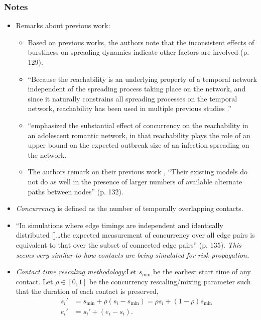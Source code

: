 \subsubsection*{Notes}
\begin{itemize}
\item Remarks about previous work:
    \begin{itemize}
        \item Based on previous works, the authors note that the inconsistent effects of burstiness on spreading dynamics indicate other factors are involved (p. 129).
        \item ``Because the reachability is an underlying property of a temporal network independent of the spreading process taking place on the network, and since it naturally constrains all spreading processes on the temporal network, reachability has been used in multiple previous studies \cite{Armbruster2017, Holme2005, Lentz2013, Moody2002, Moody2016, Onaga2017}.''
        \item \cite{Moody2002} ``emphasized the substantial effect of concurrency on the reachability in an adolescent romantic network, in that reachability plays the role of an upper bound on the expected outbreak size of an infection spreading on the network.
        \item The authors remark on their previous work \cite{Lee2019a}, ``Their existing models do not do as well in the presence of larger numbers of available alternate paths between nodes'' (p. 132).
    \end{itemize}
\item \emph{Concurrency} is defined as the number of temporally overlapping contacts.
\item ``In simulations where edge timings are independent and identically distributed [\cite{Moody2016, Lee2019a}]{\ldots}the expected measurement of concurrency over all edge pairs is equivalent to that over the subset of connected edge pairs'' (p. 135). \emph{This seems very similar to how contacts are being simulated for risk propagation.}
\item \emph{Contact time rescaling methodology}:Let $s_{\min}$ be the earliest start time of any contact. Let $\rho \in [0, 1]$ be the concurrency rescaling/mixing parameter such that the duration of each contact is preserved,
    \begin{align*}
        s_i' &= s_{\min} + \rho(s_i - s_{\min}) = \rho s_i + (1 - \rho)s_{\min} \\
        e_i' &= s_i' + (e_i - s_i).
    \end{align*}

\end{itemize}
